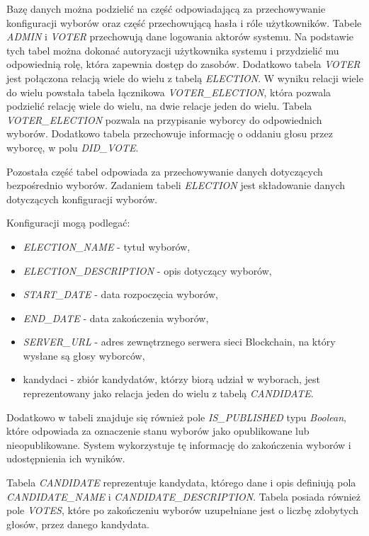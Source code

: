 \documentclass[a4paper,12pt]{book}
\begin{document}
Bazę danych można podzielić na część odpowiadającą za przechowywanie konfiguracji wyborów oraz część przechowującą hasła i róle użytkowników. Tabele \textit{ADMIN} i \textit{VOTER} przechowują dane logowania aktorów systemu. Na podstawie tych tabel można dokonać autoryzacji użytkownika systemu i przydzielić mu odpowiednią rolę, która zapewnia dostęp do zasobów. Dodatkowo tabela \textit{VOTER} jest połączona relacją wiele do wielu z tabelą \textit{ELECTION}. W wyniku relacji wiele do wielu powstała tabela łącznikowa \textit{VOTER\_ELECTION}, która pozwala podzielić relację wiele do wielu, na dwie relacje jeden do wielu. Tabela \textit{VOTER\_ELECTION} pozwala na przypisanie wyborcy do odpowiednich wyborów. Dodatkowo tabela przechowuje informację o oddaniu głosu przez wyborcę, w polu \textit{DID\_VOTE}.
 
Pozostała część tabel odpowiada za przechowywanie danych dotyczących bezpośrednio wyborów. Zadaniem tabeli \textit{ELECTION} jest składowanie danych dotyczących konfiguracji wyborów. 

Konfiguracji mogą podlegać:
\begin{itemize}
	\item \textit{ELECTION\_NAME} - tytuł wyborów,
	\item \textit{ELECTION\_DESCRIPTION} - opis dotyczący wyborów,
	\item \textit{START\_DATE} - data rozpoczęcia wyborów,
	\item \textit{END\_DATE} - data zakończenia wyborów,
	\item \textit{SERVER\_URL} - adres zewnętrznego serwera sieci Blockchain, na który wysłane są głosy wyborców,
	\item kandydaci - zbiór kandydatów, którzy biorą udział w wyborach, jest reprezentowany jako relacja jeden do wielu z tabelą \textit{CANDIDATE}.
\end{itemize}

Dodatkowo w tabeli znajduje się również pole \textit{IS\_PUBLISHED} typu \textit{Boolean}, które odpowiada za oznaczenie stanu wyborów jako opublikowane lub nieopublikowane. System wykorzystuje tę informację do zakończenia wyborów i udostępnienia ich wyników.

Tabela \textit{CANDIDATE} reprezentuje kandydata, którego dane i opis definiują pola \textit{CANDIDATE\_NAME} i \textit{CANDIDATE\_DESCRIPTION}. Tabela posiada również pole \textit{VOTES}, które po zakończeniu wyborów uzupełniane jest o liczbę zdobytych głosów, przez danego kandydata.
\end{document}
